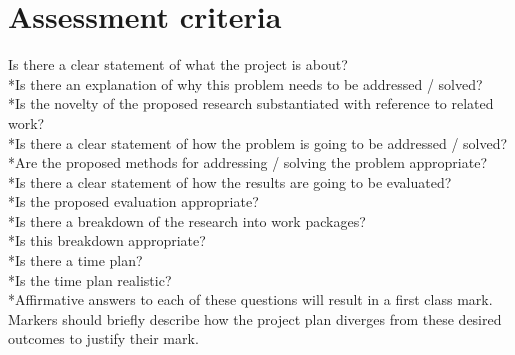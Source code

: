 \documentclass{article}
\begin{document}
\section{Assessment criteria}
Is there a clear statement of what the project is about?
\\*Is there an explanation of why this problem needs to be addressed / solved?
\\*Is the novelty of the proposed research substantiated with reference to related work?
\\*Is there a clear statement of how the problem is going to be addressed / solved?
\\*Are the proposed methods for addressing / solving the problem appropriate?
\\*Is there a clear statement of how the results are going to be evaluated?
\\*Is the proposed evaluation appropriate?
\\*Is there a breakdown of the research into work packages?
\\*Is this breakdown appropriate?
\\*Is there a time plan?
\\*Is the time plan realistic?
\newline
\\*Affirmative answers to each of these questions will result in a first class mark.  Markers should briefly describe how the project plan diverges from these desired outcomes to justify their mark.
\end{document}
